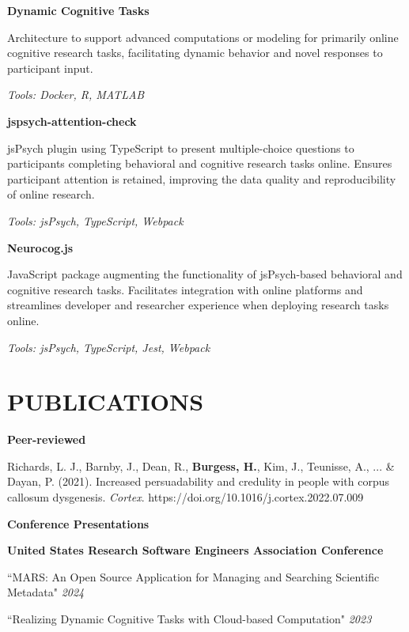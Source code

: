 \documentclass{article}
\begin{document}
  \textbf{Dynamic Cognitive Tasks}

  Architecture to support advanced computations or modeling for primarily online cognitive research tasks, facilitating dynamic behavior and novel responses to participant input.

  \textit{Tools: Docker, R, MATLAB}

  \medbreak

  \textbf{jspsych-attention-check}

  jsPsych plugin using TypeScript to present multiple-choice questions to participants completing behavioral and cognitive research tasks online. Ensures participant attention is retained, improving the data quality and reproducibility of online research.

  \textit{Tools: jsPsych, TypeScript, Webpack}

  \medbreak

  \textbf{Neurocog.js}

  JavaScript package augmenting the functionality of jsPsych-based behavioral and cognitive research tasks. Facilitates integration with online platforms and streamlines developer and researcher experience when deploying research tasks online.

  \textit{Tools: jsPsych, TypeScript, Jest, Webpack}

  \section*{\centering\uppercase{Publications}}

  {\large\textbf{Peer-reviewed}}

  Richards, L. J., Barnby, J., Dean, R., \textbf{Burgess, H.}, Kim, J., Teunisse, A., ... \& Dayan, P. (2021). Increased persuadability and credulity in people with corpus callosum dysgenesis. \textit{Cortex}.
  https://doi.org/10.1016/j.cortex.2022.07.009

  \medbreak

  {\large\textbf{Conference Presentations}}

  \textbf{United States Research Software Engineers Association Conference}

  ``MARS: An Open Source Application for Managing and Searching Scientific Metadata" \hfill \textit{2024}

  ``Realizing Dynamic Cognitive Tasks with Cloud-based Computation" \hfill \textit{2023}

  \medbreak
\end{document}
